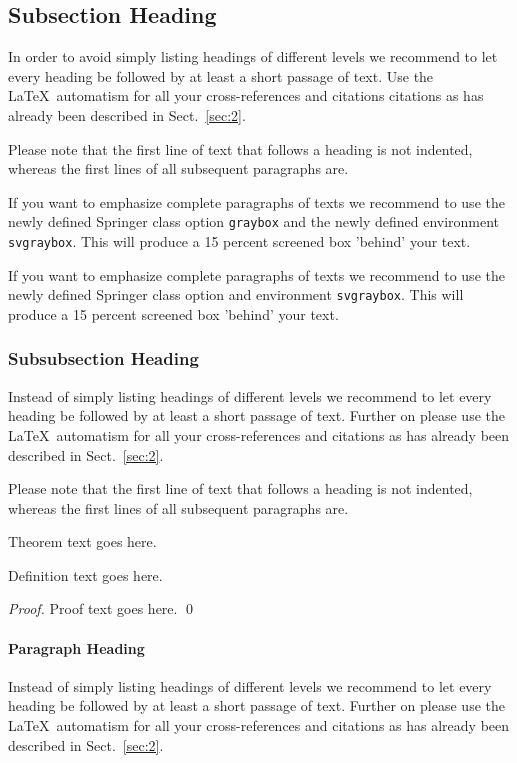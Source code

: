 \subsection{Subsection Heading} %
In order to avoid simply listing headings of different levels we recommend to let every heading be followed by at least a short passage of text. Use the \LaTeX\ automatism for all your cross-references and citations citations as has already been described in Sect.~\ref{sec:2}.

Please note that the first line of text that follows a heading is not indented, whereas the first lines of all subsequent paragraphs are.

\begin{svgraybox}
If you want to emphasize complete paragraphs of texts we recommend to use the newly defined Springer class option \verb|graybox| and the newly defined environment \verb|svgraybox|. This will produce a 15 percent screened box 'behind' your text.

If you want to emphasize complete paragraphs of texts we recommend to use the newly defined Springer class option and environment \verb|svgraybox|. This will produce a 15 percent screened box 'behind' your text.
\end{svgraybox}


\subsubsection{Subsubsection Heading}
Instead of simply listing headings of different levels we recommend to
let every heading be followed by at least a short passage of text.
Further on please use the \LaTeX\ automatism for all your
cross-references and citations as has already been described in
Sect.~\ref{sec:2}.

Please note that the first line of text that follows a heading is not indented, whereas the first lines of all subsequent paragraphs are.

\begin{theorem}
Theorem text goes here.
\end{theorem}
%
%
\begin{definition}
Definition text goes here.
\end{definition}

\begin{proof}
Proof text goes here.
\qed
\end{proof}

\paragraph{Paragraph Heading} %
Instead of simply listing headings of different levels we recommend to
let every heading be followed by at least a short passage of text.
Further on please use the \LaTeX\ automatism for all your
cross-references and citations as has already been described in
Sect.~\ref{sec:2}.

